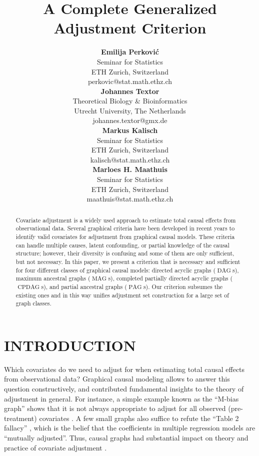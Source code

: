 \documentclass[]{article}
\title{A Complete Generalized Adjustment Criterion}
\author{ {\bf Emilija Perkovi\'c} \\
Seminar for Statistics \\
ETH Zurich, Switzerland\\
perkovic@stat.math.ethz.ch \\
\And
{\bf Johannes Textor}\\
Theoretical Biology \& Bioinformatics \\
Utrecht University, The Netherlands\\
johannes.textor@gmx.de \\
\And
{\bf Markus Kalisch}\\
Seminar for Statistics \\
ETH Zurich, Switzerland\\
kalisch@stat.math.ethz.ch\\
\And
{\bf Marloes H. Maathuis}\\
Seminar for Statistics \\
ETH Zurich, Switzerland\\
maathuis@stat.math.ethz.ch\\
}
\DeclareMathOperator{\CPDAG}{CPDAG}
\DeclareMathOperator{\DAG}{DAG}
\DeclareMathOperator{\MAG}{MAG}
\DeclareMathOperator{\PAG}{PAG}
\theoremstyle{definition}
\theoremstyle{remark}
\begin{document}
\maketitle

\begin{abstract}


Covariate adjustment is a widely used
approach to estimate total causal effects from observational
data. Several graphical criteria have been developed
in recent years to identify valid covariates for adjustment
from graphical causal models.
These criteria can handle multiple
causes, latent confounding, or partial knowledge
of the causal structure;
however, their diversity is confusing
and some of them are only sufficient, but not necessary.
In this paper, we present a criterion that is
necessary and sufficient
for four different classes of graphical causal
models: directed acyclic graphs ($\DAG$s), maximum ancestral
graphs  ($\MAG$s), completed partially directed acyclic graphs
($\CPDAG$s), and partial ancestral graphs ($\PAG$s).
Our criterion subsumes the existing ones and in this way
unifies adjustment set construction for a large set of graph classes.
\end{abstract}

\section{INTRODUCTION}\label{sec: intro}

Which covariates do we need to adjust for when estimating
total causal effects from observational data? Graphical
causal modeling allows to answer this question
constructively, and contributed fundamental insights
to the theory of adjustment in general.
For instance, a simple example known as the ``M-bias graph''
shows that it is not always appropriate to
adjust for all observed (pre-treatment) covariates
\citep{Shrier2008,Rubin2008}.
A few small graphs also suffice to refute the ``Table 2 fallacy''
\citep{Westreich2013}, which is the belief that the
coefficients in multiple regression models are ``mutually
adjusted''. Thus,
causal graphs had substantial impact on
theory and practice of covariate adjustment \citep{ShrierP2008}.
\end{document}
